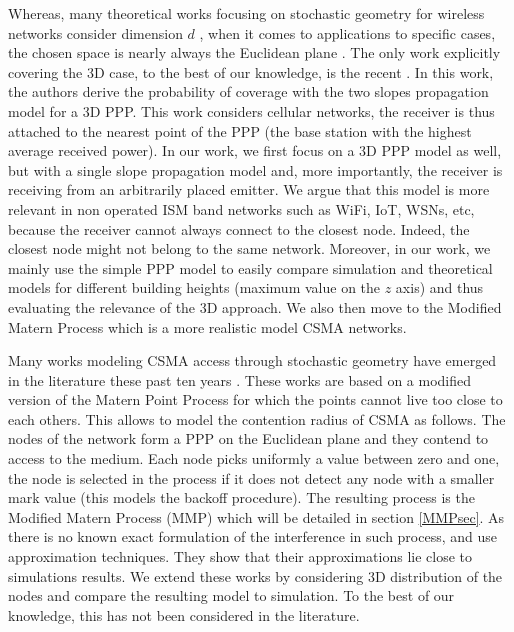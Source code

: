 \documentclass{sig-alternate-05-2015}
\begin{document}
Whereas, many theoretical works focusing on stochastic geometry for wireless networks consider dimension $d$ \cite{baccelli09,haenggi09}, when it comes to applications to specific cases, the chosen space is nearly always the Euclidean plane \cite{nguyen07,baccelli09,elsawy13}. The only work explicitly covering the 3D case, to the best of our knowledge, is the recent \cite{gupta15}. In this work, the authors derive the probability of coverage with the two slopes propagation model for a 3D PPP. This work considers cellular networks, the receiver is thus attached to the nearest point of the PPP (the base station with the highest average received power). In our work, we first focus on a 3D PPP model as well, but with a single slope propagation model and, more importantly, the receiver is receiving from an arbitrarily placed emitter. We argue that this model is more relevant in non operated ISM band networks such as WiFi, IoT, WSNs, etc, because the receiver cannot always connect to the closest node. Indeed, the closest node might not belong to the same network. Moreover, in our work, we mainly use the simple PPP model to easily compare simulation and theoretical models for different building heights (maximum value on the $z$ axis) and thus evaluating the relevance of the 3D approach. We also then move to the Modified Matern Process which is a more realistic model CSMA networks.

Many works modeling CSMA access through stochastic geometry have emerged in the literature these past ten years \cite{nguyen07,kaynia11,elsawy13}. These works are based on a modified version of the Matern Point Process for which the points cannot live too close to each others. This allows to model the contention radius of CSMA as follows. The nodes of the network form a PPP on the Euclidean plane and they contend to access to the medium. Each node picks uniformly a value between zero and one, the node is selected in the process if it does not detect any node with a smaller mark value (this models the backoff procedure). The resulting process is the Modified Matern Process (MMP) which will be detailed in section \ref{MMPsec}. As there is no known exact formulation of the interference in such process, \cite{nguyen07,kaynia11} and \cite{elsawy13} use approximation techniques. They show that their approximations lie close to simulations results. We extend these works by considering 3D distribution of the nodes and compare the resulting model to simulation. To the best of our knowledge, this has not been considered in the literature.
\end{document}
